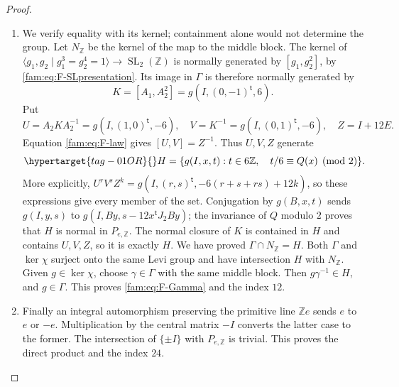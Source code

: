 \begin{proof}
\begin{enumerate}[label=\arabic*.,leftmargin=*]
\item We verify equality with its kernel; containment alone would not determine
the group.  Let $N_{\mathbb Z}$ be the kernel of the map to the middle
block.  The kernel of
$\langle g_1,g_2\mid g_1^3=g_2^4=1\rangle\to
\operatorname{SL}_2(\mathbb Z)$ is normally generated by
$[g_1,g_2^2]$, by \eqref{fam:eq:F-SLpresentation}.  Its image in $\Gamma$ is
therefore normally generated by
\[
 K=[A_1,A_2^2]=g(I,(0,-1)^{\mathsf t},6).
\]
Put
\[
 U=A_2KA_2^{-1}=g(I,(1,0)^{\mathsf t},-6),\quad
 V=K^{-1}=g(I,(0,1)^{\mathsf t},-6),\quad Z=I+12E.
\]
Equation \eqref{fam:eq:F-law} gives $[U,V]=Z^{-1}$.  Thus $U,V,Z$ generate
\begin{equation}\hypertarget{tag-01OR}{}\label{fam:eq:F-H}
 H=\{g(I,x,t):t\in6\mathbb Z,\quad t/6\equiv Q(x)\pmod2\}.
\end{equation}
More explicitly,
$U^rV^sZ^k=g(I,(r,s)^{\mathsf t},-6(r+s+rs)+12k)$, so these expressions
give every member of the set.  Conjugation by $g(B,x,t)$ sends
$g(I,y,s)$ to $g(I,By,s-12x^{\mathsf t}J_2By)$; the invariance of $Q$
modulo $2$ proves that $H$ is normal in $P_{e,\mathbb Z}$.  The normal
closure of $K$ is contained in $H$ and contains $U,V,Z$, so it is exactly
$H$.  We have proved $\Gamma\cap N_{\mathbb Z}=H$.  Both $\Gamma$ and
$\ker\chi$ surject onto the same Levi group and have intersection $H$
with $N_{\mathbb Z}$.  Given $g\in\ker\chi$, choose $\gamma\in\Gamma$
with the same middle block.  Then $g\gamma^{-1}\in H$, and $g\in\Gamma$.
This proves \eqref{fam:eq:F-Gamma} and the index $12$.

\item Finally an integral automorphism preserving the primitive line
$\mathbb Ze$ sends $e$ to $e$ or $-e$.  Multiplication by the central
matrix $-I$ converts the latter case to the former.  The intersection of
$\{\pm I\}$ with $P_{e,\mathbb Z}$ is trivial.  This proves the direct
product and the index $24$.
\end{enumerate}
\end{proof}

